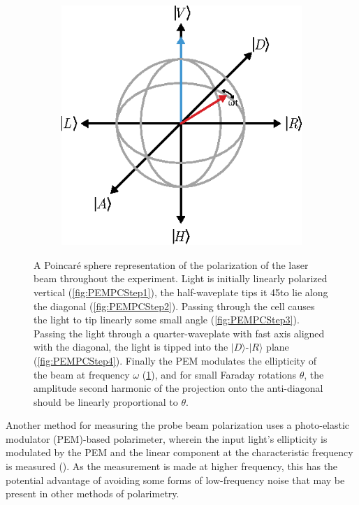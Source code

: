 \documentclass[PaulGanssle-Thesis.tex]{subfiles}
\begin{document}
\begin{figure}[ht!]
\begin{subfigure}[h]{0.3\tw}
\includegraphics[width=\tw]{figures/magnetometer/PC-Step5.eps}
\caption{}
\label{fig:PEMPCStep5}
\end{subfigure}
\caption{A Poincar\'{e} sphere representation of the polarization of the laser beam throughout the experiment. Light is initially linearly polarized vertical (\ref{fig:PEMPCStep1}), the half-waveplate tips it 45\degsym to lie along the diagonal (\ref{fig:PEMPCStep2}). Passing through the cell causes the light to tip linearly some small angle (\ref{fig:PEMPCStep3}). Passing the light through a quarter-waveplate with fast axis aligned with the diagonal, the light is tipped into the $|D\rangle$-$|R\rangle$ plane (\ref{fig:PEMPCStep4}). Finally the PEM modulates the ellipticity of the beam at frequency $\omega$ (\ref{fig:PEMPCStep5}), and for small Faraday rotations $\theta$, the amplitude second harmonic of the projection onto the anti-diagonal should be linearly proportional to $\theta$.}
\label{fig:PEMPC}
\end{figure}
Another method for measuring the probe beam polarization uses a photo-elastic modulator (PEM)-based polarimeter, wherein the input light's ellipticity is modulated by the PEM and the linear component at the characteristic frequency is measured (). As the measurement is made at higher frequency, this has the potential advantage of avoiding some forms of low-frequency noise that may be present in other methods of polarimetry.
\end{document}

